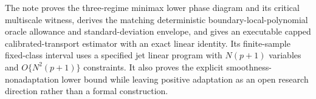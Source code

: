 The note proves the three-regime minimax lower phase diagram and its critical multiscale witness, derives the matching deterministic boundary-local-polynomial oracle allowance and standard-deviation envelope, and gives an executable capped calibrated-transport estimator with an exact linear identity. Its finite-sample fixed-class interval uses a specified jet linear program with \(N(p+1)\) variables and \(O\{N^2(p+1)\}\) constraints. It also proves the explicit smoothness-nonadaptation lower bound while leaving positive adaptation as an open research direction rather than a formal construction.